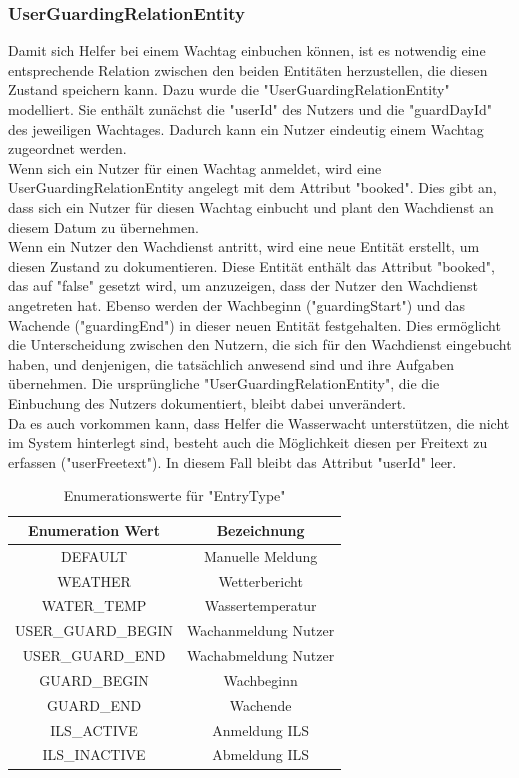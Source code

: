 \documentclass[fontsize=12pt,openright,oneside,paper=a4,BCOR=1cm]{scrbook}
\begin{document}
\subsubsection{UserGuardingRelationEntity}
Damit sich Helfer bei einem Wachtag einbuchen können, ist es notwendig eine entsprechende Relation zwischen den beiden Entitäten herzustellen, die diesen Zustand speichern kann. Dazu wurde die "UserGuardingRelationEntity" modelliert. Sie enthält zunächst die "userId" des Nutzers und die "guardDayId" des jeweiligen Wachtages. Dadurch kann ein Nutzer eindeutig einem Wachtag zugeordnet werden. \\
Wenn sich ein Nutzer für einen Wachtag anmeldet, wird eine UserGuardingRelationEntity angelegt mit dem Attribut "booked". Dies gibt an, dass sich ein Nutzer für diesen Wachtag einbucht und plant den Wachdienst an diesem Datum zu übernehmen. \\
Wenn ein Nutzer den Wachdienst antritt, wird eine neue Entität erstellt, um diesen Zustand zu dokumentieren. Diese Entität enthält das Attribut "booked", das auf "false" gesetzt wird, um anzuzeigen, dass der Nutzer den Wachdienst angetreten hat. Ebenso werden der Wachbeginn ("guardingStart") und das Wachende ("guardingEnd") in dieser neuen Entität festgehalten. Dies ermöglicht die Unterscheidung zwischen den Nutzern, die sich für den Wachdienst eingebucht haben, und denjenigen, die tatsächlich anwesend sind und ihre Aufgaben übernehmen. Die ursprüngliche "UserGuardingRelationEntity", die die Einbuchung des Nutzers dokumentiert, bleibt dabei unverändert.\\
Da es auch vorkommen kann, dass Helfer die Wasserwacht unterstützen, die nicht im System hinterlegt sind, besteht auch die Möglichkeit diesen per Freitext zu erfassen ("userFreetext"). In diesem Fall bleibt das Attribut "userId" leer. 

\begin{table}[ht]
\centering
\caption{Enumerationswerte für "EntryType"}
\label{tab:entrytype}
\begin{tabular}{|c|c|}
\hline
Enumeration Wert & Bezeichnung \\
\hline
DEFAULT & Manuelle Meldung \\
WEATHER & Wetterbericht	 \\
WATER\_TEMP & Wassertemperatur \\
USER\_GUARD\_BEGIN & Wachanmeldung Nutzer\\
    USER\_GUARD\_END & Wachabmeldung Nutzer\\
    GUARD\_BEGIN & Wachbeginn\\
    GUARD\_END & Wachende\\
    ILS\_ACTIVE & Anmeldung ILS\\
    ILS\_INACTIVE & Abmeldung ILS\\
\hline
\end{tabular}
\end{table}
\end{document}
